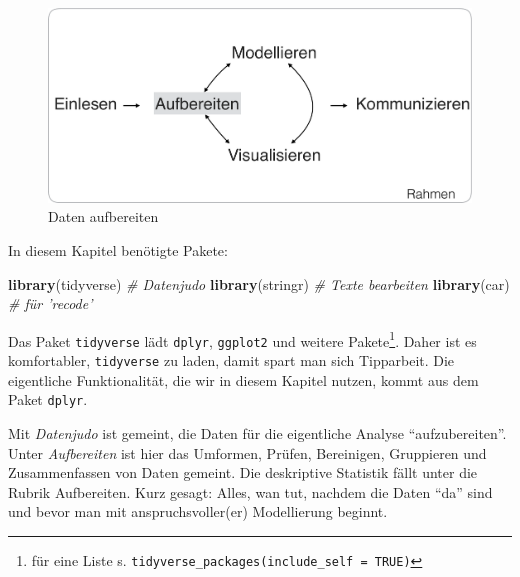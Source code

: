 \documentclass[12pt,ngerman,]{book}
\newenvironment{Shaded}{\begin{snugshade}}{\end{snugshade}}
\newcommand{\KeywordTok}[1]{\textcolor[rgb]{0.13,0.29,0.53}{\textbf{{#1}}}}
\newcommand{\CommentTok}[1]{\textcolor[rgb]{0.56,0.35,0.01}{\textit{{#1}}}}
\newcommand{\NormalTok}[1]{{#1}}
\let\rmarkdownfootnote\footnote%
\def\footnote{\protect\rmarkdownfootnote}
\renewenvironment{Shaded}{\begin{kframe}}{\end{kframe}}
\begin{document}
\begin{figure}

{\centering \includegraphics[width=0.7\linewidth]{images/Datenjudo/Aufbereiten} 

}

\caption{Daten aufbereiten}\label{fig:fig-datenjudo}
\end{figure}

In diesem Kapitel benötigte Pakete:

\begin{Shaded}
\begin{Highlighting}[]
\KeywordTok{library}\NormalTok{(tidyverse)  }\CommentTok{# Datenjudo}
\KeywordTok{library}\NormalTok{(stringr)   }\CommentTok{# Texte bearbeiten}
\KeywordTok{library}\NormalTok{(car)  }\CommentTok{# für 'recode'}
\end{Highlighting}
\end{Shaded}

Das Paket \texttt{tidyverse} lädt \texttt{dplyr}, \texttt{ggplot2} und
weitere Pakete\footnote{für eine Liste s.
  \texttt{tidyverse\_packages(include\_self\ =\ TRUE)}}. Daher ist es
komfortabler, \texttt{tidyverse} zu laden, damit spart man sich
Tipparbeit. Die eigentliche Funktionalität, die wir in diesem Kapitel
nutzen, kommt aus dem Paket \texttt{dplyr}.

Mit \emph{Datenjudo} ist gemeint, die Daten für die
eigentliche Analyse ``aufzubereiten''. Unter
\emph{Aufbereiten} ist hier das Umformen, Prüfen,
Bereinigen, Gruppieren und Zusammenfassen von Daten gemeint. Die
deskriptive Statistik fällt unter die Rubrik Aufbereiten. Kurz gesagt:
Alles, wan tut, nachdem die Daten ``da'' sind und bevor man mit
anspruchsvoller(er) Modellierung beginnt.
\end{document}
